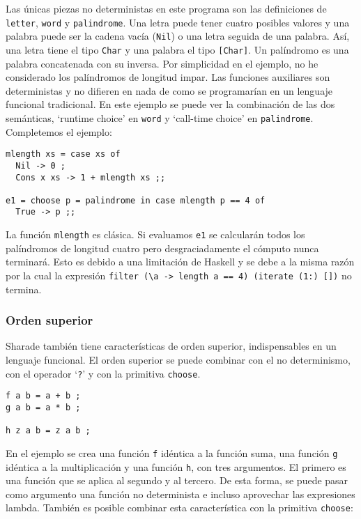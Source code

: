 \documentclass[class=article, crop=false]{standalone}
\begin{document}
Las únicas piezas no deterministas en este programa son las definiciones de \verb`letter`,
\verb`word` y \verb`palindrome`. Una letra puede tener cuatro posibles valores y una palabra
puede ser la cadena vacía (\verb`Nil`) o una letra seguida de una palabra. Así, una letra
tiene el tipo \verb`Char` y una palabra el tipo \verb`[Char]`. Un palíndromo es una palabra
concatenada con su inversa. Por simplicidad en el ejemplo, no he considerado los palíndromos
de longitud impar. Las funciones auxiliares son deterministas y no difieren en nada de como
se programarían en un lenguaje funcional tradicional. En este ejemplo se puede ver la
combinación de las dos semánticas, `runtime choice' en \verb`word` y `call-time
choice' en \verb`palindrome`. Completemos el ejemplo:

\begin{verbatim}
mlength xs = case xs of
  Nil -> 0 ;
  Cons x xs -> 1 + mlength xs ;;

e1 = choose p = palindrome in case mlength p == 4 of
  True -> p ;;
\end{verbatim}

La función \verb`mlength` es clásica. Si evaluamos \verb`e1` se calcularán todos los
palíndromos de longitud cuatro pero desgraciadamente el cómputo nunca terminará. Esto es
debido a una limitación de Haskell y se debe a la misma razón por la cual la expresión
\verb`filter (\a -> length a == 4) (iterate (1:) [])` no termina.

\subsubsection{Orden superior}

Sharade también tiene características de orden superior, indispensables en un lenguaje
funcional. El orden superior se puede combinar con el no determinismo, con el operador
`\verb`?`' y con la primitiva \verb`choose`.

\begin{verbatim}
f a b = a + b ;
g a b = a * b ;

h z a b = z a b ;
\end{verbatim}

En el ejemplo se crea una función \verb`f` idéntica a la función suma, una función \verb`g`
idéntica a la multiplicación y una función \verb`h`, con tres argumentos. El primero es una
función que se aplica al segundo y al tercero. De esta forma, se puede pasar como argumento
una función no determinista e incluso aprovechar las expresiones lambda. También es posible
combinar esta característica con la primitiva \verb`choose`:
\end{document}
